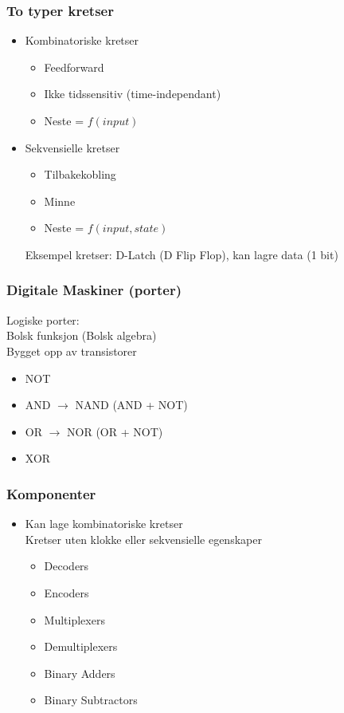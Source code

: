 \documentclass{article}
\begin{document}
					\subsubsection{To typer kretser}
						\begin{itemize}
							\item Kombinatoriske kretser
								\begin{itemize}
									\item Feedforward
									\item Ikke tidssensitiv (time-independant)
									\item Neste = $f(input)$
								\end{itemize}
							\item Sekvensielle kretser
								\begin{itemize}
									\item Tilbakekobling
									\item Minne
									\item Neste = $f(input, state)$
								\end{itemize}
								Eksempel kretser: D-Latch (D Flip Flop), kan lagre data (1 bit)
							
						\end{itemize}
					\subsubsection{Digitale Maskiner (porter)}
					Logiske porter: \\
					\indent Bolsk funksjon (Bolsk algebra) \\
					\indent Bygget opp av transistorer
						\begin{itemize}
							\item NOT
							\item AND $\rightarrow$ NAND (AND + NOT)
							\item OR $\rightarrow$ NOR (OR + NOT)
							\item XOR
						\end{itemize}
					\subsubsection{Komponenter}
						\begin{itemize}
							\item Kan lage kombinatoriske kretser \\
							\indent Kretser uten klokke eller sekvensielle egenskaper
							\begin{itemize}
								\item Decoders
								\item Encoders
								\item Multiplexers
								\item Demultiplexers
								\item Binary Adders
								\item Binary Subtractors
							\end{itemize}
	
						\end{itemize}		
				
\end{document}
